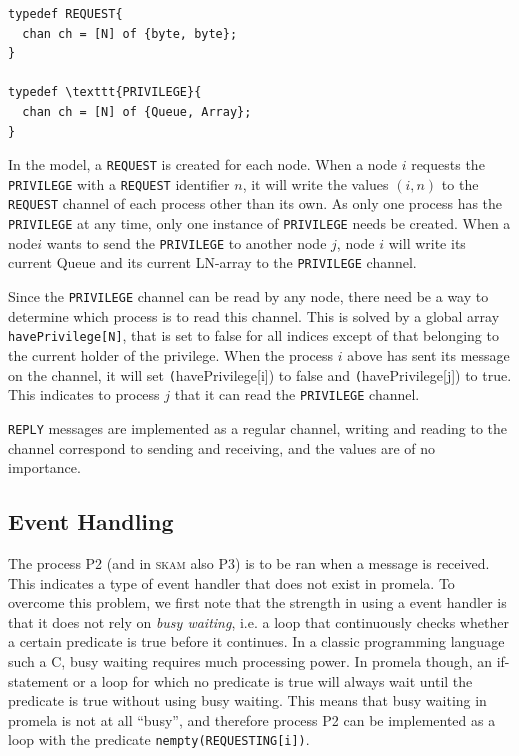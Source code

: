\documentclass[a4paper,10pt]{llncs}
\begin{document}
\begin{lstlisting}
typedef REQUEST{
  chan ch = [N] of {byte, byte};
}

typedef \texttt{PRIVILEGE}{
  chan ch = [N] of {Queue, Array};
}

\end{lstlisting}


In the model, a \texttt{REQUEST} is created for each node. When a node $i$ requests the \texttt{PRIVILEGE} with a \texttt{REQUEST} identifier $n$, it will write the values $(i,n)$ to the \texttt{REQUEST} channel of each process other than its own. As only one process has the \texttt{PRIVILEGE} at any time, only one instance of \texttt{PRIVILEGE} needs be created. When a node$i$ wants to send the \texttt{PRIVILEGE} to another node $j$, node $i$ will write its current Queue and its current LN-array to the \texttt{PRIVILEGE} channel.

Since the \texttt{PRIVILEGE} channel can be read by any node, there need be a way to determine which process is to read this channel. This is solved by a global array \texttt{havePrivilege[N]}, that is set to false for all indices except of that belonging to the current holder of the privilege. When the process $i$ above has sent its message on the channel, it will set \texttt (havePrivilege[i]) to false and \texttt (havePrivilege[j]) to true. This indicates to process $j$ that it can read the \texttt{PRIVILEGE} channel.

\texttt{REPLY} messages are implemented as a regular channel, writing and reading to the channel correspond to sending and receiving, and the values are of no importance.

\subsection{Event Handling}
The process P2 (and in \textsc{skam} also P3) is to be ran when a message is received. This indicates a type of event handler that does not exist in promela. To overcome this problem, we first note that the strength in using a event handler is that it does not rely on \emph{busy waiting}, i.e. a loop that continuously checks whether a certain predicate is true before it continues. In a classic programming language such a C, busy waiting requires much processing power. In promela though, an if-statement or a loop for which no predicate is true will always wait until the predicate is true without using busy waiting. This means that busy waiting in promela is not at all ``busy'', and therefore  process P2 can be implemented as a loop with the predicate \texttt{nempty(REQUESTING[i])}.
\end{document}
